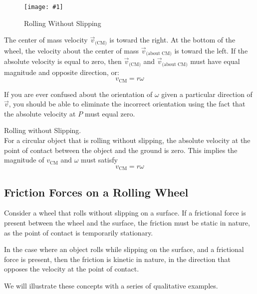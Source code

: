 \documentclass[11pt]{article}
\newcommand{\fig}[4]{
    \begin{figure}[H]
        \centering
        \texttt{[image: \#1]}
        \caption{#2}
        \label{exp4fit}
    \end{figure}
}
\theoremstyle{gangnamstyle}{\newtheorem{definition}{Definition}[]}
\theoremstyle{gangnamstyle}{\newtheorem{example}{Example}[]}
\theoremstyle{gangnamstyle}{\newtheorem{problem}{Problem}[]}
\theoremstyle{gangnamstyle}{\newtheorem{warning}{Warning}[]}
\begin{document}
\fig{figs/n8/rollwoslip.jpeg}{Rolling Without Slipping}{0.11}{0}

The center of mass velocity $\Vec{v}_{\text{(CM)}}$ is toward the right. At the bottom of the wheel, the velocity about the center of mass $\Vec{v}_{\text{(about CM)}}$ is toward the left. If the absolute velocity is equal to zero, then $\Vec{v}_{\text{(CM)}}$ and $\Vec{v}_{\text{(about CM)}}$ must have equal magnitude and opposite direction, or: 
\[ v_{\text{CM}} = r\omega \]

If you are ever confused about the orientation of $\omega$ given a particular direction of $\Vec{v}$, you should be able to eliminate the incorrect orientation using the fact that the absolute velocity at $P$ must equal zero. 

\begin{definition}
Rolling without Slipping. \\
For a circular object that is rolling without slipping, the absolute velocity at the point of contact between the object and the ground is zero. This implies the magnitude of $v_{\text{CM}}$ and $\omega$ must satisfy
\begin{equation}
v_{\text{CM}} = r\omega
\end{equation}
\end{definition}

\subsection{Friction Forces on a Rolling Wheel}

Consider a wheel that rolls without slipping on a surface. If a frictional force is present between the wheel and the surface, the friction must be static in nature, as the point of contact is temporarily stationary. 

In the case where an object rolls while slipping on the surface, and a frictional force is present, then the friction is kinetic in nature, in the direction that opposes the velocity at the point of contact. 

We will illustrate these concepts with a series of qualitative examples. 
\end{document}
